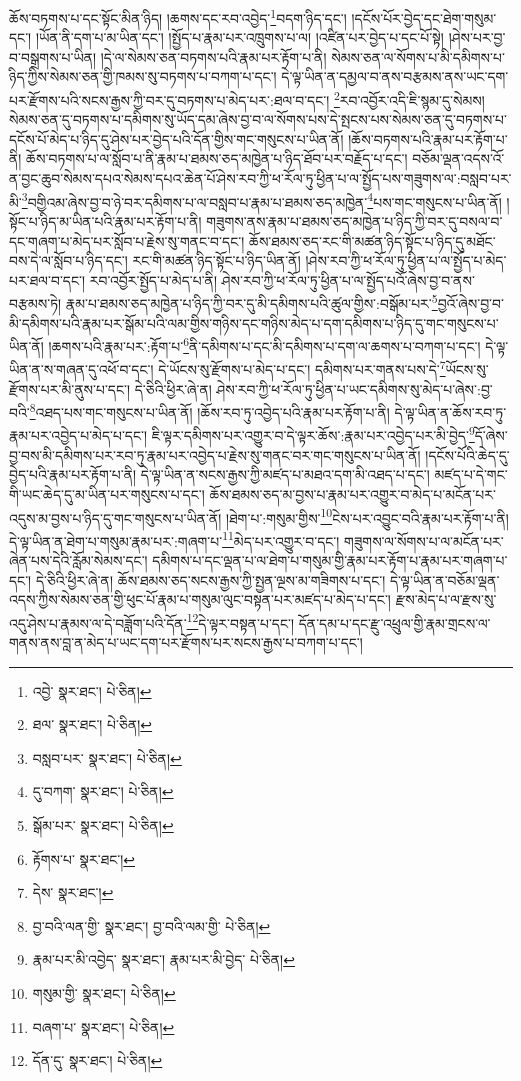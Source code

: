 ཆོས་བཏགས་པ་དང་སྟོང་མིན་ཉིད། །ཆགས་དང་རབ་འབྱེད་\footnote{འབྱེ་  སྣར་ཐང་།  པེ་ཅིན། }བདག་ཉིད་དང་། །དངོས་པོར་བྱེད་དང་ཐེག་གསུམ་དང་། །ཡོན་ནི་དག་པ་མ་ཡིན་དང་། །སྤྱོད་པ་རྣམ་པར་འཁྲུགས་པ་ལ། །འཛིན་པར་བྱེད་པ་དང་པོ་སྟེ། །ཤེས་པར་བྱ་བ་བསྒྲགས་པ་ཡིན། །དེ་ལ་སེམས་ཅན་བཏགས་པའི་རྣམ་པར་རྟོག་པ་ནི། སེམས་ཅན་ལ་སོགས་པ་མི་དམིགས་པ་ཉིད་ཀྱིས་སེམས་ཅན་གྱི་ཁམས་སུ་བཏགས་པ་བཀག་པ་དང་། དེ་ལྟ་ཡིན་ན་དམྱལ་བ་ནས་བརྩམས་ནས་ཡང་དག་པར་རྫོགས་པའི་སངས་རྒྱས་ཀྱི་བར་དུ་བཏགས་པ་མེད་པར་:ཐལ་བ་དང་། \footnote{ཐལ་  སྣར་ཐང་།  པེ་ཅིན། }རབ་འབྱོར་འདི་ཇི་སྙམ་དུ་སེམས། སེམས་ཅན་དུ་བཏགས་པ་དམིགས་སུ་ཡོད་དམ་ཞེས་བྱ་བ་ལ་སོགས་པས་དེ་སྤངས་པས་སེམས་ཅན་དུ་བཏགས་པ་དངོས་པོ་མེད་པ་ཉིད་དུ་ཤེས་པར་བྱེད་པའི་དོན་གྱིས་གང་གསུངས་པ་ཡིན་ནོ། །ཆོས་བཏགས་པའི་རྣམ་པར་རྟོག་པ་ནི། ཆོས་བཏགས་པ་ལ་སློབ་པ་ནི་རྣམ་པ་ཐམས་ཅད་མཁྱེན་པ་ཉིད་ཐོབ་པར་བརྗོད་པ་དང་། བཅོམ་ལྡན་འདས་འོ་ན་བྱང་ཆུབ་སེམས་དཔའ་སེམས་དཔའ་ཆེན་པོ་ཤེས་རབ་ཀྱི་ཕ་རོལ་ཏུ་ཕྱིན་པ་ལ་སྤྱོད་པས་གཟུགས་ལ་:བསླབ་པར་མི་\footnote{བསླབ་པར་  སྣར་ཐང་།  པེ་ཅིན། }བགྱིའམ་ཞེས་བྱ་བ་ཉེ་བར་དམིགས་པ་ལ་བསླབ་པ་རྣམ་པ་ཐམས་ཅད་མཁྱེན་\footnote{དུ་བཀག་  སྣར་ཐང་།  པེ་ཅིན། }པས་གང་གསུངས་པ་ཡིན་ནོ། །སྟོང་པ་ཉིད་མ་ཡིན་པའི་རྣམ་པར་རྟོག་པ་ནི། གཟུགས་ནས་རྣམ་པ་ཐམས་ཅད་མཁྱེན་པ་ཉིད་ཀྱི་བར་དུ་བསལ་བ་དང་གཞག་པ་མེད་པར་སློབ་པ་རྗེས་སུ་གནང་བ་དང་། ཆོས་ཐམས་ཅད་རང་གི་མཚན་ཉིད་སྟོང་པ་ཉིད་དུ་མཐོང་བས་དེ་ལ་སློབ་པ་ཉིད་དང་། རང་གི་མཚན་ཉིད་སྟོང་པ་ཉིད་ཡིན་ནོ། །ཤེས་རབ་ཀྱི་ཕ་རོལ་ཏུ་ཕྱིན་པ་ལ་སྤྱོད་པ་མེད་པར་ཐལ་བ་དང་། རབ་འབྱོར་སྤྱོད་པ་མེད་པ་ནི། ཤེས་རབ་ཀྱི་ཕ་རོལ་ཏུ་ཕྱིན་པ་ལ་སྤྱོད་པའོ་ཞེས་བྱ་བ་ནས་བརྩམས་ཏེ། རྣམ་པ་ཐམས་ཅད་མཁྱེན་པ་ཉིད་ཀྱི་བར་དུ་མི་དམིགས་པའི་ཚུལ་གྱིས་:བསྒོམ་པར་\footnote{སྒོམ་པར་  སྣར་ཐང་།  པེ་ཅིན། }བྱའོ་ཞེས་བྱ་བ་མི་དམིགས་པའི་རྣམ་པར་སྒོམ་པའི་ལམ་གྱིས་གཉིས་དང་གཉིས་མེད་པ་དག་དམིགས་པ་ཉིད་དུ་གང་གསུངས་པ་ཡིན་ནོ། །ཆགས་པའི་རྣམ་པར་:རྟོག་པ་\footnote{རྟོགས་པ་  སྣར་ཐང་། }ནི་དམིགས་པ་དང་མི་དམིགས་པ་དག་ལ་ཆགས་པ་བཀག་པ་དང་། དེ་ལྟ་ཡིན་ན་ས་གཞན་དུ་འཕོ་བ་དང་། དེ་ཡོངས་སུ་རྫོགས་པ་མེད་པ་དང་། དམིགས་པར་གནས་པས་དེ་\footnote{དེས་  སྣར་ཐང་། }ཡོངས་སུ་རྫོགས་པར་མི་ནུས་པ་དང་། དེ་ཅིའི་ཕྱིར་ཞེ་ན། ཤེས་རབ་ཀྱི་ཕ་རོལ་ཏུ་ཕྱིན་པ་ཡང་དམིགས་སུ་མེད་པ་ཞེས་:བྱ་བའི་\footnote{བྱ་བའི་ལན་གྱི་  སྣར་ཐང་། བྱ་བའི་ལམ་གྱི་  པེ་ཅིན། }འཐད་པས་གང་གསུངས་པ་ཡིན་ནོ། །ཆོས་རབ་ཏུ་འབྱེད་པའི་རྣམ་པར་རྟོག་པ་ནི། དེ་ལྟ་ཡིན་ན་ཆོས་རབ་ཏུ་རྣམ་པར་འབྱེད་པ་མེད་པ་དང་། ཇི་ལྟར་དམིགས་པར་འགྱུར་བ་དེ་ལྟར་ཆོས་:རྣམ་པར་འབྱེད་པར་མི་བྱེད་\footnote{རྣམ་པར་མི་འབྱེད་  སྣར་ཐང་། རྣམ་པར་མི་བྱེད་  པེ་ཅིན། }དོ་ཞེས་བྱ་བས་མི་དམིགས་པར་རབ་ཏུ་རྣམ་པར་འབྱེད་པ་རྗེས་སུ་གནང་བར་གང་གསུངས་པ་ཡིན་ནོ། །དངོས་པོའི་ཆེད་དུ་བྱེད་པའི་རྣམ་པར་རྟོག་པ་ནི། དེ་ལྟ་ཡིན་ན་སངས་རྒྱས་ཀྱི་མཛད་པ་མཐའ་དག་མི་འཐད་པ་དང་། མཛད་པ་དེ་གང་གི་ཡང་ཆེད་དུ་མ་ཡིན་པར་གསུངས་པ་དང་། ཆོས་ཐམས་ཅད་མ་བྱས་པ་རྣམ་པར་འགྱུར་བ་མེད་པ་མངོན་པར་འདུས་མ་བྱས་པ་ཉིད་དུ་གང་གསུངས་པ་ཡིན་ནོ། །ཐེག་པ་:གསུམ་གྱིས་\footnote{གསུམ་གྱི་  སྣར་ཐང་།  པེ་ཅིན། }ངེས་པར་འབྱུང་བའི་རྣམ་པར་རྟོག་པ་ནི། དེ་ལྟ་ཡིན་ན་ཐེག་པ་གསུམ་རྣམ་པར་:གཞག་པ་\footnote{བཞག་པ་  སྣར་ཐང་།  པེ་ཅིན། }མེད་པར་འགྱུར་བ་དང་། གཟུགས་ལ་སོགས་པ་ལ་མངོན་པར་ཞེན་པས་དེའི་རློམ་སེམས་དང་། དམིགས་པ་དང་ལྡན་པ་ལ་ཐེག་པ་གསུམ་གྱི་རྣམ་པར་རྟོག་པ་རྣམ་པར་གཞག་པ་དང་། དེ་ཅིའི་ཕྱིར་ཞེ་ན། ཆོས་ཐམས་ཅད་སངས་རྒྱས་ཀྱི་སྤྱན་ལྔས་མ་གཟིགས་པ་དང་། དེ་ལྟ་ཡིན་ན་བཅོམ་ལྡན་འདས་ཀྱིས་སེམས་ཅན་གྱི་ཕུང་པོ་རྣམ་པ་གསུམ་ལུང་བསྟན་པར་མཛད་པ་མེད་པ་དང་། རྫས་མེད་པ་ལ་རྫས་སུ་འདུ་ཤེས་པ་རྣམས་ལ་དེ་བཟློག་པའི་དོན་\footnote{དོན་དུ་  སྣར་ཐང་།  པེ་ཅིན། }དེ་ལྟར་བསྟན་པ་དང་། དོན་དམ་པ་དང་རྫུ་འཕྲུལ་གྱི་རྣམ་གྲངས་ལ་གནས་ནས་བླ་ན་མེད་པ་ཡང་དག་པར་རྫོགས་པར་སངས་རྒྱས་པ་བཀག་པ་དང་། 